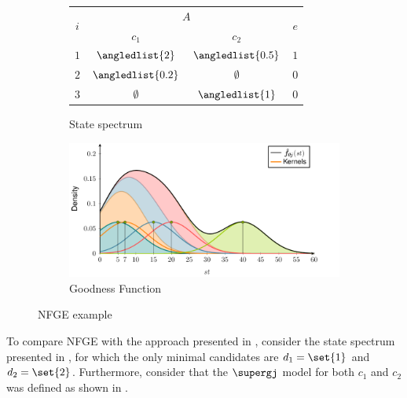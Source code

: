 \begin{figure}[ht]
  \begin{subfigure}{0.35\columnwidth}
    \begin{minipage}[t][4.5cm][c]{\columnwidth}
      \centering
      \begin{tabular}[b]{c|cc|c}
        \multirow{2}{*}{$i$} & \multicolumn{2}{c|}{$A$} & \multirow{2}{*}{$e$}     \\
        \cline{2-3}
                             & $c_1$                    & $c_2$              &     \\ \hline
        $1$                  & $\angledlist{2}$         & $\angledlist{0.5}$ & $1$ \\
        $2$                  & $\angledlist{0.2}$       & $\emptyset$        & $0$ \\
        $3$                  & $\emptyset$              & $\angledlist{1}$   & $0$ \\
      \end{tabular}
    \end{minipage}
    \caption{State spectrum\label{fig:nfge:example_constant_goodness-a}}
  \end{subfigure}%
  \begin{subfigure}{0.65\columnwidth}
    \begin{minipage}[t][4.5cm][c]{\columnwidth}
      \centering
      \includegraphics[page=5]{figures/nfge/figures/main}
    \end{minipage}
    \caption{Goodness Function\label{fig:nfge:example_constant_goodness-b}}
  \end{subfigure}
  \caption{\acs{NFGE} example\label{fig:nfge:example_constant_goodness}}
\end{figure}

To compare \ac{NFGE} with the approach presented in
, consider the state
spectrum presented in , for
which the only minimal candidates are $d_1=\set{1}$ and $d_2=\set{2}$.
%
Furthermore, consider that the $\supergj$ model for both $c_1$ and
$c_2$ was defined as shown in
.

